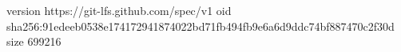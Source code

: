 version https://git-lfs.github.com/spec/v1
oid sha256:91edeeb0538e174172941874022bd71fb494fb9e6a6d9ddc74bf887470c2f30d
size 699216
